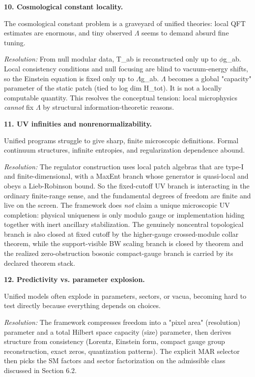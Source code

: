 \textbf{10. Cosmological constant locality.}

The cosmological constant problem is a graveyard of unified theories: local QFT estimates are enormous, and tiny observed \ensuremath{\Lambda} seems to demand absurd fine tuning.

\emph{Resolution:} From null modular data, T\_ab is reconstructed only up to \ensuremath{\phi}g\_ab. Local consistency conditions and null focusing are blind to vacuum-energy shifts, so the Einstein equation is fixed only up to \ensuremath{\Lambda}g\_ab. \ensuremath{\Lambda} becomes a global "capacity" parameter of the static patch (tied to log dim H\_tot). It is not a locally computable quantity. This resolves the conceptual tension: local microphysics \emph{cannot} fix \ensuremath{\Lambda} by structural information-theoretic reasons.

\textbf{11. UV infinities and nonrenormalizability.}

Unified programs struggle to give sharp, finite microscopic definitions. Formal continuum structures, infinite entropies, and regularization dependence abound.

\emph{Resolution:} The regulator construction uses local patch algebras that are type-I and finite-dimensional, with a MaxEnt branch whose generator is quasi-local and obeys a Lieb-Robinson bound. So the fixed-cutoff UV branch is interacting in the ordinary finite-range sense, and the fundamental degrees of freedom are finite and live on the screen. The framework does \emph{not} claim a unique microscopic UV completion: physical uniqueness is only modulo gauge or implementation hiding together with inert ancillary stabilization. The genuinely noncentral topological branch is also closed at fixed cutoff by the higher-gauge crossed-module collar theorem, while the support-visible BW scaling branch is closed by theorem and the realized zero-obstruction bosonic compact-gauge branch is carried by its declared theorem stack.

\textbf{12. Predictivity vs. parameter explosion.}

Unified models often explode in parameters, sectors, or vacua, becoming hard to test directly because everything depends on choices.

\emph{Resolution:} The framework compresses freedom into a "pixel area" (resolution) parameter and a total Hilbert space capacity (size) parameter, then derives structure from consistency (Lorentz, Einstein form, compact gauge group reconstruction, exact zeros, quantization patterns). The explicit MAR selector then picks the SM factors and sector factorization on the admissible class discussed in Section 6.2.

